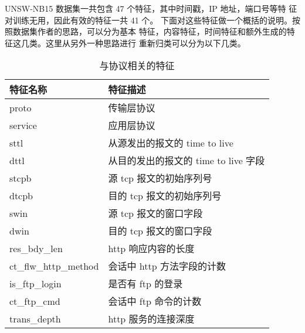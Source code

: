  
UNSW-NB15 数据集一共包含 47 个特征，其中时间戳，IP 地址，端口号等特
征对训练无用，因此有效的特征一共 41 个。 
下面对这些特征做一个概括的说明。按照数据集作者的思路，可以分为基本
特征，内容特征，时间特征和额外生成的特征这几类。这里从另外一种思路进行
重新归类可以分为以下几类。


\begin{table}[H]
    \caption{与协议相关的特征}
    \centering
    \begin{tabular}{|l|l|}
    \hline
    特征名称                  & 特征描述                      \\ \hline
    proto                 & 传输层协议                     \\ \hline
    service               & 应用层协议                     \\ \hline
    sttl                  & 从源发出的报文的 time to live     \\ \hline
    dttl                  & 从目的发出的报文的 time to live 字段 \\ \hline
    stcpb                 & 源 tcp 报文的初始序列号            \\ \hline
    dtcpb                 & 目的 tcp 报文的初始序列号           \\ \hline
    swin                  & 源 tcp 报文的窗口字段             \\ \hline
    dwin                  & 目的 tcp 报文的窗口字段            \\ \hline
    res\_bdy\_len         & http 响应内容的长度              \\ \hline
    ct\_flw\_http\_method & 会话中 http 方法字段的计数          \\ \hline
    is\_ftp\_login        & 是否有 ftp 的登录               \\ \hline
    ct\_ftp\_cmd          & 会话中 ftp 命令的计数             \\ \hline
    trans\_depth          & http 服务的连接深度              \\ \hline
    \end{tabular}
    \end{table}

